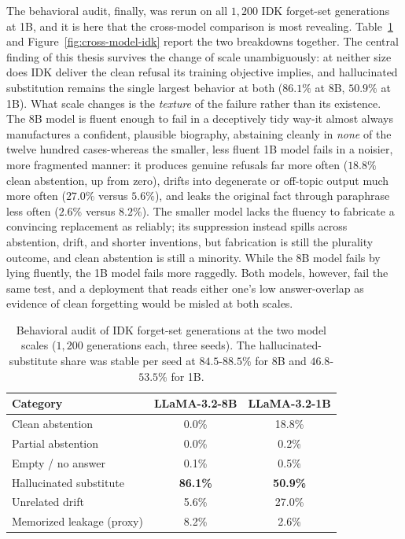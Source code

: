 \documentclass[a4paper,12pt]{report}
\begin{document}
The behavioral audit, finally, was rerun on all $1{,}200$ IDK forget-set generations at 1B, and it is here that the cross-model comparison is most revealing. Table~\ref{tab:cross-model-idk} and Figure~\ref{fig:cross-model-idk} report the two breakdowns together. The central finding of this thesis survives the change of scale unambiguously: at neither size does IDK deliver the clean refusal its training objective implies, and hallucinated substitution remains the single largest behavior at both ($86.1\%$ at 8B, $50.9\%$ at 1B). What scale changes is the \emph{texture} of the failure rather than its existence. The 8B model is fluent enough to fail in a deceptively tidy way-it almost always manufactures a confident, plausible biography, abstaining cleanly in \emph{none} of the twelve hundred cases-whereas the smaller, less fluent 1B model fails in a noisier, more fragmented manner: it produces genuine refusals far more often ($18.8\%$ clean abstention, up from zero), drifts into degenerate or off-topic output much more often ($27.0\%$ versus $5.6\%$), and leaks the original fact through paraphrase less often ($2.6\%$ versus $8.2\%$). The smaller model lacks the fluency to fabricate a convincing replacement as reliably; its suppression instead spills across abstention, drift, and shorter inventions, but fabrication is still the plurality outcome, and clean abstention is still a minority. While the 8B model fails by lying fluently, the 1B model fails more raggedly. Both models, however, fail the same test, and a deployment that reads either one's low answer-overlap as evidence of clean forgetting would be misled at both scales.
\begin{table}[htbp]
	\centering
	\caption{Behavioral audit of IDK forget-set generations at the two model scales ($1{,}200$ generations each, three seeds). The hallucinated-substitute share was stable per seed at $84.5$-$88.5\%$ for 8B and $46.8$-$53.5\%$ for 1B.}
	\label{tab:cross-model-idk}
	\begin{tabular}{lcc}
		\toprule
		\textbf{Category} & \textbf{LLaMA-3.2-8B} & \textbf{LLaMA-3.2-1B} \\
		\midrule
		Clean abstention & 0.0\% & 18.8\% \\
		Partial abstention & 0.0\% & 0.2\% \\
		Empty / no answer & 0.1\% & 0.5\% \\
		Hallucinated substitute & \textbf{86.1\%} & \textbf{50.9\%} \\
		Unrelated drift & 5.6\% & 27.0\% \\
		Memorized leakage (proxy) & 8.2\% & 2.6\% \\
		\bottomrule
	\end{tabular}
\end{table}
\end{document}
